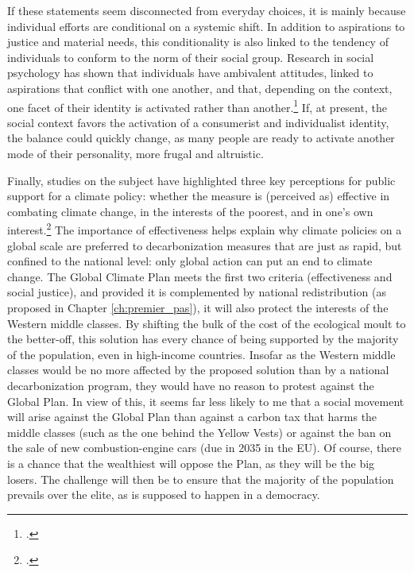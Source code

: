 \documentclass[a5paper,english,openany]{memoir}
\begin{document}
If these statements seem disconnected from everyday choices, it is mainly because individual efforts are conditional on a systemic shift. In addition to aspirations to justice and material needs, this conditionality is also linked to the tendency of individuals to conform to the norm of their social group. Research in social psychology has shown that individuals have ambivalent attitudes, linked to aspirations that conflict with one another, and that, depending on the context, one facet of their identity is activated rather than another.\footnote{\citet{kim_normative_2012,fielding_social_2016}.} %
If, at present, the social context favors the activation of a consumerist and individualist identity, the balance could quickly change, as many people are ready to activate another mode of their personality, more frugal and altruistic.

Finally, studies on the subject have highlighted three key perceptions for public support for a climate policy: whether the measure is (perceived as) effective in combating climate change, in the interests of the poorest, and in one's own interest.\footnote{\citet{dechezlepretre_fighting_2022}.} The importance of effectiveness helps explain why climate policies on a global scale are preferred to decarbonization measures that are just as rapid, but confined to the national level: only global action can put an end to climate change. The Global Climate Plan meets the first two criteria (effectiveness and social justice), and provided it is complemented by national redistribution (as proposed in Chapter \ref{ch:premier_pas}), it will also protect the interests of the Western middle classes. By shifting the bulk of the cost of the ecological moult to the better-off, this solution has every chance of being supported by the majority of the population, even in high-income countries. Insofar as the Western middle classes would be no more affected by the proposed solution than by a national decarbonization program, they would have no reason to protest against the Global Plan. In view of this, it seems far less likely to me that a social movement will arise against the Global Plan than against a carbon tax that harms the middle classes (such as the one behind the Yellow Vests) or against the ban on the sale of new combustion-engine cars (due in 2035 in the EU). Of course, there is a chance that the wealthiest will oppose the Plan, as they will be the big losers. The challenge will then be to ensure that the majority of the population prevails over the elite, as is supposed to happen in a democracy.
\end{document}
